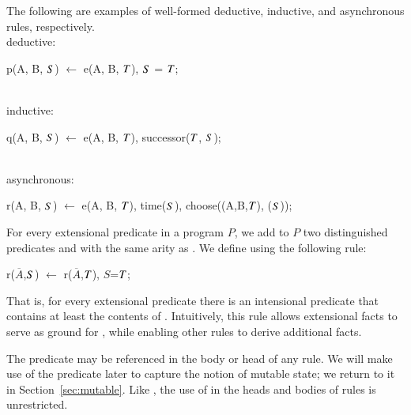 \begin{example}
The following are examples of well-formed deductive, inductive, and asynchronous rules, respectively.
\\
deductive:
\begin{Dedalus}
p(A, B, \(\DS\)) \(\leftarrow\) e(A, B, \(\DT\)), \(\DS\) = \(\DT\);
\end{Dedalus}
\\
inductive:
\begin{Dedalus}
q(A, B, \(\DS\)) \(\leftarrow\) e(A, B, \(\DT\)), successor(\(\DT\), \(\DS\));
\end{Dedalus}
\\
asynchronous:
\begin{Dedalus}
r(A, B, \(\DS\)) \(\leftarrow\) e(A, B, \(\DT\)), time(\(\DS\)),
   choose((A,B,\(\DT\)), (\(\DS\)));
\end{Dedalus}
\end{example}
For every extensional predicate  in a \lang program $P$, we add to
$P$ two distinguished predicates  and  with the same arity
as .  We define  using the following rule:

\begin{dedalus}
r\pos($\overline{A}$,\(\DS\)) \(\leftarrow\) r($\overline{A}$,\(\DT\)), \(S\)=\(\DT\);
\end{dedalus}

   

\noindent{}That is, for every extensional predicate  there is an intensional
predicate  that contains at least the contents of .
Intuitively, this rule allows extensional facts to serve as ground for
, while enabling other rules to derive additional  facts.

The predicate  may be referenced in the body or head of any \lang rule.  
We will make use of the predicate  later to capture the notion of mutable state; we return to it in Section~\ref{sec:mutable}. 
Like , the use of  in the heads and bodies of rules is unrestricted.

